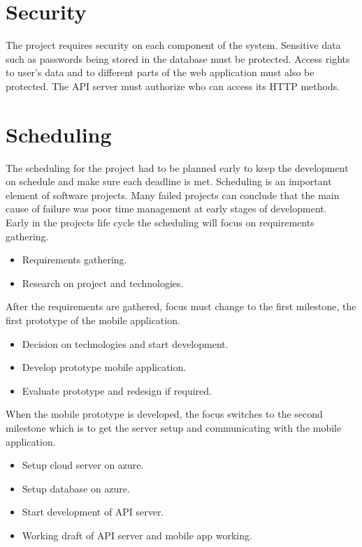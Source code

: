 \section{Security}
The project requires security on each component of the system. Sensitive data such as passwords being stored in the database must be protected. Access rights to user’s data and to different parts of the web application must also be protected. The API server must authorize who can access its HTTP methods.

\section{Scheduling}
The scheduling for the project had to be planned early to keep the development on schedule and make sure each deadline is met. Scheduling is an important element of software projects. Many failed projects can conclude that the main cause of failure was poor time management at early stages of development. \\

Early in the projects life cycle the scheduling will focus on requirements gathering.
\begin{itemize}
\item Requirements gathering.
\item Research on project and technologies.
\end{itemize}		


After the requirements are gathered, focus must change to the first milestone, the first prototype of the mobile application.
\begin{itemize}
\item Decision on technologies and start development.
\item Develop prototype mobile application.
\item Evaluate prototype and redesign if required.
\end{itemize}


When the mobile prototype is developed, the focus switches to the second milestone which is to get the server setup and communicating with the mobile application.
\begin{itemize}
\item Setup cloud server on azure.
\item Setup database on azure.
\item Start development of API server.
\item Working draft of API server and mobile app working.
\end{itemize}


